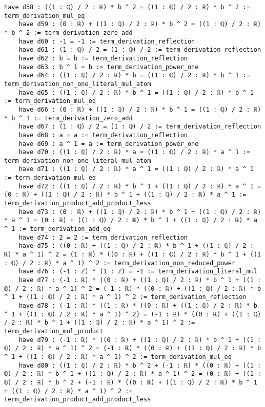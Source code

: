 \documentclass{article}
\begin{document}
\begin{tcolorbox}[colback=white!10, width=\linewidth]
\begin{lstlisting}[language=Lean4]
    have d58 : ((1 : ℚ) / 2 : ℝ) * b ^ 2 = ((1 : ℚ) / 2 : ℝ) * b ^ 2 := term_derivation_mul_eq
    have d59 : (0 : ℝ) + ((1 : ℚ) / 2 : ℝ) * b ^ 2 = ((1 : ℚ) / 2 : ℝ) * b ^ 2 := term_derivation_zero_add
    have d60 : -1 = -1 := term_derivation_reflection
    have d61 : (1 : ℚ) / 2 = (1 : ℚ) / 2 := term_derivation_reflection
    have d62 : b = b := term_derivation_reflection
    have d63 : b ^ 1 = b := term_derivation_power_one
    have d64 : ((1 : ℚ) / 2 : ℝ) * b = ((1 : ℚ) / 2 : ℝ) * b ^ 1 := term_derivation_non_one_literal_mul_atom
    have d65 : ((1 : ℚ) / 2 : ℝ) * b ^ 1 = ((1 : ℚ) / 2 : ℝ) * b ^ 1 := term_derivation_mul_eq
    have d66 : (0 : ℝ) + ((1 : ℚ) / 2 : ℝ) * b ^ 1 = ((1 : ℚ) / 2 : ℝ) * b ^ 1 := term_derivation_zero_add
    have d67 : (1 : ℚ) / 2 = (1 : ℚ) / 2 := term_derivation_reflection
    have d68 : a = a := term_derivation_reflection
    have d69 : a ^ 1 = a := term_derivation_power_one
    have d70 : ((1 : ℚ) / 2 : ℝ) * a = ((1 : ℚ) / 2 : ℝ) * a ^ 1 := term_derivation_non_one_literal_mul_atom
    have d71 : ((1 : ℚ) / 2 : ℝ) * a ^ 1 = ((1 : ℚ) / 2 : ℝ) * a ^ 1 := term_derivation_mul_eq
    have d72 : ((1 : ℚ) / 2 : ℝ) * b ^ 1 + ((1 : ℚ) / 2 : ℝ) * a ^ 1 = (0 : ℝ) + ((1 : ℚ) / 2 : ℝ) * b ^ 1 + ((1 : ℚ) / 2 : ℝ) * a ^ 1 := term_derivation_product_add_product_less
    have d73 : (0 : ℝ) + ((1 : ℚ) / 2 : ℝ) * b ^ 1 + ((1 : ℚ) / 2 : ℝ) * a ^ 1 = (0 : ℝ) + ((1 : ℚ) / 2 : ℝ) * b ^ 1 + ((1 : ℚ) / 2 : ℝ) * a ^ 1 := term_derivation_add_eq
    have d74 : 2 = 2 := term_derivation_reflection
    have d75 : ((0 : ℝ) + ((1 : ℚ) / 2 : ℝ) * b ^ 1 + ((1 : ℚ) / 2 : ℝ) * a ^ 1) ^ 2 = (1 : ℝ) * ((0 : ℝ) + ((1 : ℚ) / 2 : ℝ) * b ^ 1 + ((1 : ℚ) / 2 : ℝ) * a ^ 1) ^ 2 := term_derivation_non_reduced_power
    have d76 : (-1 : ℤ) * (1 : ℤ) = -1 := term_derivation_literal_mul
    have d77 : (-1 : ℝ) * ((0 : ℝ) + ((1 : ℚ) / 2 : ℝ) * b ^ 1 + ((1 : ℚ) / 2 : ℝ) * a ^ 1) ^ 2 = (-1 : ℝ) * ((0 : ℝ) + ((1 : ℚ) / 2 : ℝ) * b ^ 1 + ((1 : ℚ) / 2 : ℝ) * a ^ 1) ^ 2 := term_derivation_reflection
    have d78 : (-1 : ℝ) * ((1 : ℝ) * ((0 : ℝ) + ((1 : ℚ) / 2 : ℝ) * b ^ 1 + ((1 : ℚ) / 2 : ℝ) * a ^ 1) ^ 2) = (-1 : ℝ) * ((0 : ℝ) + ((1 : ℚ) / 2 : ℝ) * b ^ 1 + ((1 : ℚ) / 2 : ℝ) * a ^ 1) ^ 2 := term_derivation_mul_product
    have d79 : (-1 : ℝ) * ((0 : ℝ) + ((1 : ℚ) / 2 : ℝ) * b ^ 1 + ((1 : ℚ) / 2 : ℝ) * a ^ 1) ^ 2 = (-1 : ℝ) * ((0 : ℝ) + ((1 : ℚ) / 2 : ℝ) * b ^ 1 + ((1 : ℚ) / 2 : ℝ) * a ^ 1) ^ 2 := term_derivation_mul_eq
    have d80 : ((1 : ℚ) / 2 : ℝ) * b ^ 2 + (-1 : ℝ) * ((0 : ℝ) + ((1 : ℚ) / 2 : ℝ) * b ^ 1 + ((1 : ℚ) / 2 : ℝ) * a ^ 1) ^ 2 = (0 : ℝ) + ((1 : ℚ) / 2 : ℝ) * b ^ 2 + (-1 : ℝ) * ((0 : ℝ) + ((1 : ℚ) / 2 : ℝ) * b ^ 1 + ((1 : ℚ) / 2 : ℝ) * a ^ 1) ^ 2 := term_derivation_product_add_product_less

\end{lstlisting}
\end{tcolorbox}
\end{document}
